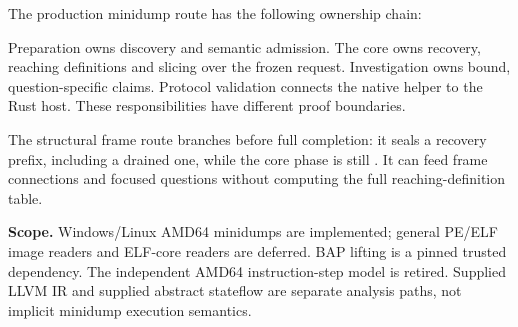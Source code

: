\documentclass[11pt,a4paper]{article}
\newcommand{\code}[1]{\texttt{\detokenize{#1}}}
\begin{document}
The production minidump route has the following ownership chain:
\begin{center}
\end{center}
Preparation owns discovery and semantic admission. The core owns recovery,
reaching definitions and slicing over the frozen request. Investigation owns
bound, question-specific claims. Protocol validation connects the native
helper to the Rust host. These responsibilities have different proof boundaries.

The structural frame route branches before full completion: it seals a
recovery prefix, including a drained one, while the core phase is still
\code{Recover}. It can feed frame connections and focused questions without
computing the full reaching-definition table.

\textbf{Scope.} Windows/Linux AMD64 minidumps are implemented; general PE/ELF
image readers and ELF-core readers are deferred. BAP lifting is a pinned trusted
dependency. The independent AMD64 instruction-step model is retired. Supplied
LLVM IR and supplied abstract stateflow are separate analysis paths, not
implicit minidump execution semantics.
\end{document}
